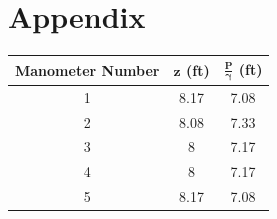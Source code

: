 \documentclass{article}
\begin{document}
\section{Appendix}
\begin{center}
    \begin{tabular}{|c|c|c|} 
        \hline
        \textbf{Manometer Number} & \textbf{\(\bm{z}\) (ft)} & \textbf{\(\bm{\frac{P}{\gamma}}\) (ft)}  \\ 
        \hline
        1                         & 8.17              & 7.08                     \\ 
        \hline
        2                         & 8.08              & 7.33                     \\ 
        \hline
        3                         & 8              & 7.17                     \\ 
        \hline
        4                         & 8              & 7.17                     \\ 
        \hline
        5                         & 8.17              & 7.08                     \\
        \hline
    \end{tabular}
\end{center}
\end{document}
